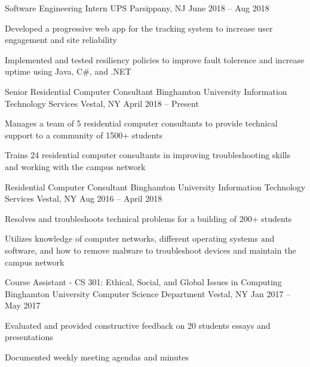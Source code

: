 \documentclass[]{awesome-cv}
\begin{document}
\begin{cventries}
	\cventry
    {Software Engineering Intern}
	{UPS}
	{Parsippany, NJ}
	{June 2018 – Aug 2018}
	{\begin{cvitems}
		\item {Developed a progressive web app for the tracking system to increase user engagement and site reliability}
		\item {Implemented and tested resiliency policies to improve fault tolerence and increase uptime using Java, C\#, and .NET}
	\end{cvitems}}
	\cventry
	{Senior Residential Computer Consultant}
	{Binghamton University Information Technology Services}
	{Vestal, NY}
	{April 2018 – Present}
	{\begin{cvitems}
		\item {Manages a team of 5 residential computer consultants to provide technical support to a community of 1500+ students}
		\item {Trains 24 residential computer consultants in improving troubleshooting skills and working with the campus network}
	\end{cvitems}}
	\cventry
	{Residential Computer Consultant}
	{Binghamton University Information Technology Services}
	{Vestal, NY}
	{Aug 2016 – April 2018}
	{\begin{cvitems}
		\item {Resolves and troubleshoots technical problems for a building of 200+ students}
		\item {Utilizes knowledge of computer networks, different operating systems and software, and how to remove malware to troubleshoot devices and maintain the campus network}
	\end{cvitems}}
	\cventry
	{Course Assistant - CS 301: Ethical, Social, and Global Issues in Computing}
	{Binghamton University Computer Science Department}
	{Vestal, NY}
	{Jan 2017 – May 2017}
	{\begin{cvitems}
		\item {Evaluated and provided constructive feedback on 20 students\textquotesingle{} essays and presentations}
		\item {Documented weekly meeting agendas and minutes}
	\end{cvitems}}
\end{cventries}
\vspace{-2mm}
\end{document}
